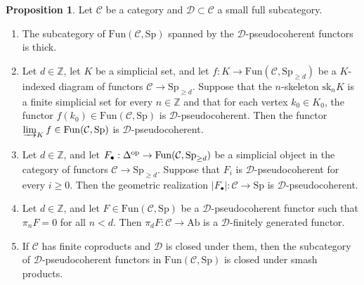 \documentclass{amsart}
\newcommand{\Sp}{\mathrm{Sp}}
\newcommand{\fun}{\mathrm{Fun}}
\theoremstyle{definition}
\newtheorem{proposition}[definition]{Proposition}
\newcommand{\bb}{\mathbb}
\newcommand{\sub}[1]{{\mbox{\rm \scriptsize #1}}}
\begin{document}
\begin{proposition} 
\label{general:pscoh}
Let $\mathcal C$ be a category and $\mathcal{D} \subset \mathcal{C}$ a
small full subcategory.
\begin{enumerate} 
\item  
The subcategory of $\fun(\mathcal{C}, \Sp)$ spanned by the $\mathcal{D}$-pseudocoherent
functors is thick.
\item Let $d \in \mathbb{Z}$,  let $K$ be a simplicial set, and let $f: K \to
\fun(\mathcal{C}, \Sp_{\geq d})$ be a
$K$-indexed diagram of functors $\mathcal{C}
\to \Sp_{\geq d}$. Suppose that
the $n$-skeleton 
$\mathrm{sk}_n K$ is a finite simplicial set for every $n\in\mathbb Z$ and
that for each vertex $k_0 \in K_0$, the functor $f(k_0) \in \fun(\mathcal{C}, \Sp)$ is $\mathcal{D}$-pseudocoherent. 
Then the functor $\varinjlim_K f \in \fun(\mathcal{C}, \Sp)$ is
$\mathcal{D}$-pseudocoherent. 
\item 
Let $d \in \mathbb{Z}$, and let $F_\bullet:\Delta^\sub{op}\to \fun(\mathcal{C}, \Sp_{\geq d})$ be a simplicial object in the category of functors $\mathcal{C}
\to \Sp_{\geq d}$. Suppose that $F_i$ is $\mathcal{D}$-pseudocoherent for every $i \geq 0$. Then the
geometric realization $|F_\bullet|: \mathcal{C} \to \Sp$ is $\mathcal{D}$-pseudocoherent. 
\item Let $d\in \bb Z$, and let $F\in \fun(\mathcal{C}, \Sp)$ be a
$\mathcal{D}$-pseudocoherent functor such that $\pi_nF=0$ for all $n<d$. Then $\pi_d F: \mathcal{C} \to \mathrm{Ab}$ is a
 $\mathcal{D}$-finitely generated functor. 
 \item If $\mathcal{C}$ has finite coproducts and $\mathcal{D}$ is closed
 under them, then the subcategory of
 $\mathcal{D}$-pseudocoherent functors in $\fun(\mathcal{C}, \Sp)$ is closed under smash
 products. 
\end{enumerate}
\end{proposition} 
\end{document}

